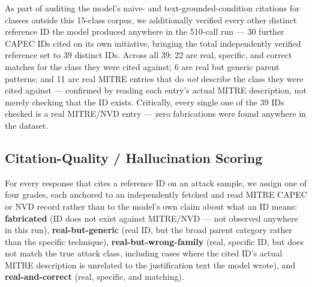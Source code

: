 \documentclass[10pt,twocolumn]{article}
\begin{document}
As part of auditing the model's naive- and text-grounded-condition citations for classes outside this 15-class corpus, we additionally verified every other distinct reference ID the model produced anywhere in the 510-call run --- 30 further CAPEC IDs cited on its own initiative, bringing the total independently verified reference set to 39 distinct IDs. Across all 39: 22 are real, specific, and correct matches for the class they were cited against; 6 are real but generic parent patterns; and 11 are real MITRE entries that do \emph{not} describe the class they were cited against --- confirmed by reading each entry's actual MITRE description, not merely checking that the ID exists. Critically, every single one of the 39 IDs checked is a real MITRE/NVD entry --- zero fabrications were found anywhere in the dataset.

\subsection{Citation-Quality / Hallucination Scoring}
\label{sec:scoring}

For every response that cites a reference ID on an attack sample, we assign one of four grades, each anchored to an independently fetched and read MITRE CAPEC or NVD record rather than to the model's own claim about what an ID means: \textbf{fabricated} (ID does not exist against MITRE/NVD --- not observed anywhere in this run), \textbf{real-but-generic} (real ID, but the broad parent category rather than the specific technique), \textbf{real-but-wrong-family} (real, specific ID, but does not match the true attack class, including cases where the cited ID's actual MITRE description is unrelated to the justification text the model wrote), and \textbf{real-and-correct} (real, specific, and matching).
\end{document}
